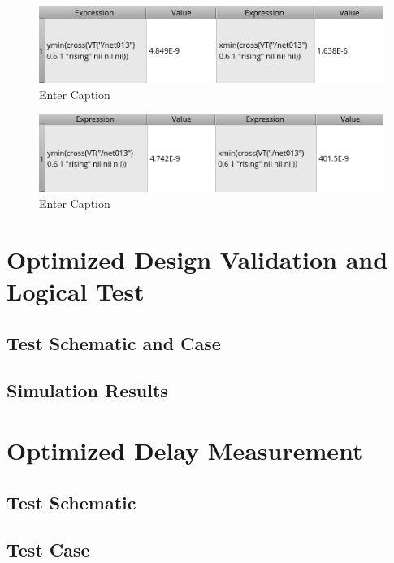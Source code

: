 \documentclass[12pt]{article}
\begin{document}
\begin{figure}[H]
    \centering
    \includegraphics[width=0.5\linewidth]{writeup//figures/optimized_wmux_value.png}
    \caption{Enter Caption}
\end{figure}

\begin{figure}[H]
    \centering
    \includegraphics[width=0.5\linewidth]{writeup//figures/optimized_wbuf_value.png}
    \caption{Enter Caption}
\end{figure}

\newpage

\section{Optimized Design Validation and Logical Test}
\subsection{Test Schematic and Case}



\newpage

\subsection{Simulation Results}



\newpage

\section{Optimized Delay Measurement}
\subsection{Test Schematic}



\newpage

\subsection{Test Case}
\end{document}
